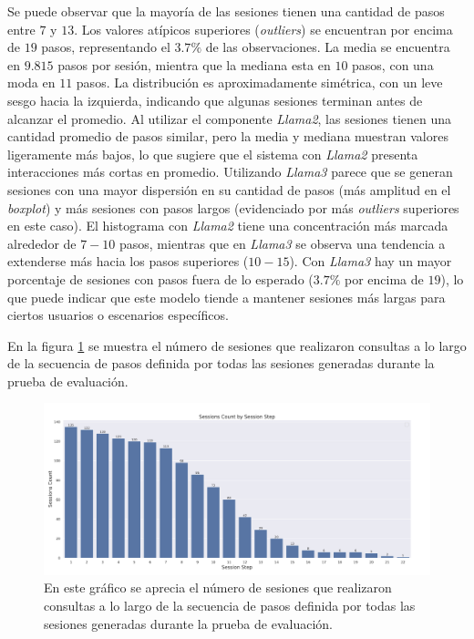 \documentclass[11pt,a4paper,twoside]{thesis}
\begin{document}
Se puede observar que la mayoría de las sesiones tienen una cantidad de pasos entre $7$ y $13$. Los valores atípicos superiores (\textit{outliers}) se encuentran por encima de $19$ pasos, representando el $3.7\%$ de las observaciones. La media se encuentra en $9.815$ pasos por sesión, mientra que la mediana esta en $10$ pasos, con una moda en $11$ pasos. La distribución es aproximadamente simétrica, con un leve sesgo hacia la izquierda, indicando que algunas sesiones terminan antes de alcanzar el promedio. Al utilizar el componente \textit{Llama2}, las sesiones tienen una cantidad promedio de pasos similar, pero la media y mediana muestran valores ligeramente más bajos, lo que sugiere que el sistema con \textit{Llama2} presenta interacciones más cortas en promedio. Utilizando \textit{Llama3} parece que se generan sesiones con una mayor dispersión en su cantidad de pasos (más amplitud en el \textit{boxplot}) y más sesiones con pasos largos (evidenciado por más \textit{outliers} superiores en este caso). El histograma con \textit{Llama2} tiene una concentración más marcada alrededor de $7-10$ pasos, mientras que en \textit{Llama3} se observa una tendencia a extenderse más hacia los pasos superiores ($10-15$). Con \textit{Llama3} hay un mayor porcentaje de sesiones con pasos fuera de lo esperado ($3.7\%$ por encima de $19$), lo que puede indicar que este modelo tiende a mantener sesiones más largas para ciertos usuarios o escenarios específicos.

\clearpage

En la figura \ref{fig:llama3-sessions_count_by_session_step} se muestra el número de sesiones que realizaron consultas a lo largo de la secuencia de pasos definida por todas las sesiones generadas durante la prueba de evaluación.

\begin{figure}[H]
	\centering
	\includegraphics[width=15cm]{./images/llama3/sessions_count_by_session_step.png}
	\caption{En este gráfico se aprecia el número de sesiones que realizaron consultas a lo largo de la secuencia de pasos definida por todas las sesiones generadas durante la prueba de evaluación.}
	\label{fig:llama3-sessions_count_by_session_step}
\end{figure}
\end{document}
